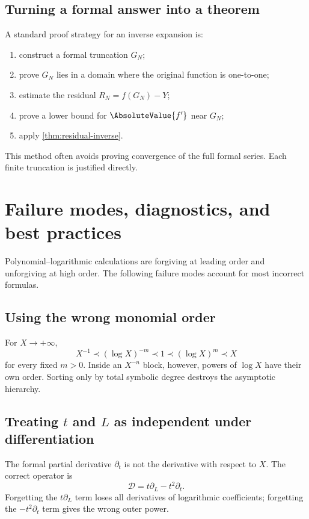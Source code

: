 \documentclass[11pt,oneside]{book}
\theoremstyle{definition}
\theoremstyle{remark}
\newcommand{\D}{\mathcal D}
\newcommand{\precdom}{\prec}
\begin{document}
\section{Turning a formal answer into a theorem}
A standard proof strategy for an inverse expansion is:
\begin{enumerate}
\item construct a formal truncation $G_N$;
\item prove $G_N$ lies in a domain where the original function is
      one-to-one;
\item estimate the residual $R_N=f(G_N)-Y$;
\item prove a lower bound for $\AbsoluteValue{f'}$ near $G_N$;
\item apply \cref{thm:residual-inverse}.
\end{enumerate}
This method often avoids proving convergence of the full formal series.
Each finite truncation is justified directly.

\chapter{Failure modes, diagnostics, and best practices}
\label{ch:pitfalls}

Polynomial--logarithmic calculations are forgiving at leading order and
unforgiving at high order. The following failure modes account for most
incorrect formulas.

\section{Using the wrong monomial order}
For $X\to+\infty$,
\[
 X^{-1}\precdom(\log X)^{-m}\precdom1\precdom(\log X)^m\precdom X
\]
for every fixed $m>0$. Inside an $X^{-n}$ block, however, powers of
$\log X$ have their own order. Sorting only by total symbolic degree
destroys the asymptotic hierarchy.

\section{Treating \texorpdfstring{$t$}{t} and \texorpdfstring{$L$}{L} as independent under differentiation}
The formal partial derivative $\partial_t$ is not the derivative with
respect to $X$. The correct operator is
\[
 \D=t\partial_L-t^2\partial_t.
\]
Forgetting the $t\partial_L$ term loses all derivatives of logarithmic
coefficients; forgetting the $-t^2\partial_t$ term gives the wrong outer
power.
\end{document}
